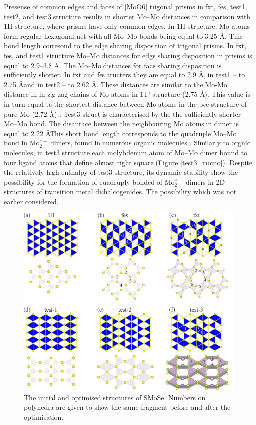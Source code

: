 \documentclass[a4paperm]{article}
\begin{document}
Presense of common edges and faces of [MoO6] trigonal prisms in fxt, fes, test1, test2, and test3 structure results in shorter Mo--Mo distances in comparison with 1H structure, where prisms have only common edges.
In 1H structure, Mo atoms form regular hexagonal net with all Mo--Mo bonds being equal to 3.25 \AA.
This bond length corresond to the edge sharing disposition of trigonal prisms.
In fxt, fes, and test1 structure Mo--Mo distances for edge sharing disposition in prisms is equal to 2.9--3.8 \AA.
The Mo--Mo distances for face sharing disposition is sufficiently shorter.
In fxt and fes tructers they are equal to 2.9 \AA, in test1 -- to 2.75 \AA and in test2 -- to 2.62 \AA.
These distances are similar to the Mo-Mo distance in  in zig-zag chains of Mo atoms in 1T' structure (2.75 \AA).
This value is in turn equal to the shortest distance between Mo atoms in the bcc structure of pure Mo (2.72 \AA) \cite{MoV}.
Test3 struct is characterised by the the sufficiently shorter Mo--Mo bond.
The disantace between the neighbouring Mo atoms in dimer is equal to 2.22 \AA\.
This short bond length corresponds to the quadruple Mo--Mo bond in Mo$_2^{4+}$ dimers, found in numerous organic molecules \cite{momo}.
Similarly to orgnic molecules, in test3 structure  each molybdenum atom of Mo--Mo dimer bound to four ligand atoms that define almost right square (Figure \ref{test3_momo}).
Despite the relatively high enthalpy of test3 structure, its dynamic stability show the possibility for the formation of quadruply bonded of Mo$_2^{4+}$ dimers in 2D structures of transition metal dichalcogenides.
The possibility which was not earlier considered.

\begin{figure}[H] \centering
        \includegraphics[width=\textwidth]{H-based.png}
        \caption{The initial and optimised structures of SMoSe. Numbers on polyhedra are given to show the same fragment before and after the optimisation.}
\label{H-based}
\end{figure}
\end{document}
